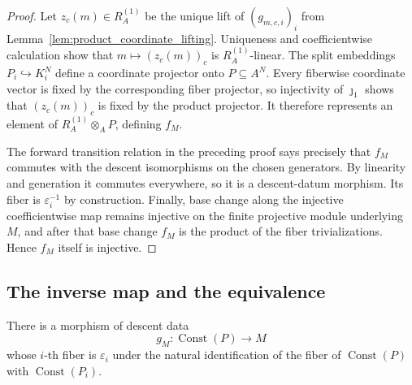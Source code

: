 \begin{proof}
  \leanok
  Let $z_c(m)\in R_A^{(1)}$ be the unique lift of
  $(g_{m,c,i})_i$ from Lemma~\ref{lem:product_coordinate_lifting}.  Uniqueness
  and coefficientwise calculation show that $m\mapsto(z_c(m))_c$ is
  $R_A^{(1)}$-linear.  The split embeddings $P_i\hookrightarrow K_i^N$ define
  a coordinate projector onto $P\subseteq A^N$.  Every fiberwise coordinate
  vector is fixed by the corresponding fiber projector, so injectivity of
  $\jmath_1$ shows that $(z_c(m))_c$ is fixed by the product projector.  It
  therefore represents an element of $R_A^{(1)}\otimes_AP$, defining $f_M$.

  The forward transition relation in the preceding proof says precisely that
  $f_M$ commutes with the descent isomorphisms on the chosen generators.  By
  linearity and generation it commutes everywhere, so it is a descent-datum
  morphism.  Its fiber is $\varepsilon_i^{-1}$ by construction.  Finally,
  base change along the injective coefficientwise map remains injective on the
  finite projective module underlying $M$, and after that base change $f_M$ is
  the product of the fiber trivializations.  Hence $f_M$ itself is injective.
\end{proof}

\subsection{The inverse map and the equivalence}

\begin{lemma}
  \label{lem:product_from_constant}
  \leanok
  There is a morphism of descent data
  \[
    g_M\colon\operatorname{Const}(P)\longrightarrow M
  \]
  whose $i$-th fiber is $\varepsilon_i$ under the natural identification of the
  fiber of $\operatorname{Const}(P)$ with $\operatorname{Const}(P_i)$.
\end{lemma}

